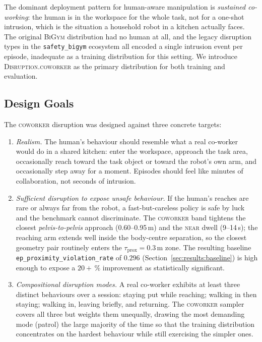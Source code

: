 \documentclass[11pt,a4paper]{report}
\newcommand{\bigym}{\textsc{BiGym}}
\newcommand{\sbigym}{\texttt{safety\_bigym}}
\newcommand{\coworker}{\textsc{coworker}}
\begin{document}
The dominant deployment pattern for human-aware manipulation is
\emph{sustained co-working}: the human is in the workspace for the
whole task, not for a one-shot intrusion, which is the situation a
household robot in a kitchen actually faces. The original \bigym{}
distribution had no human at all, and the legacy disruption types in
the \sbigym{} ecosystem all encoded a single intrusion event per
episode, inadequate as a training distribution for this setting. We
introduce \textsc{Disruption.coworker} as the primary distribution
for both training and evaluation.

\subsection{Design Goals}
\label{sec:bench:coworker:design}

The \coworker{} disruption was designed against three concrete
targets:

\begin{enumerate}[topsep=2pt,itemsep=2pt]
\item \emph{Realism.} The human's behaviour should resemble what a
  real co-worker would do in a shared kitchen: enter the workspace,
  approach the task area, occasionally reach toward the task object
  or toward the robot's own arm, and occasionally step
  away for a moment. Episodes should feel like minutes of
  collaboration, not seconds of intrusion.
\item \emph{Sufficient disruption to expose unsafe behaviour.} If
  the human's reaches are rare or always far from the robot, a
  fast-but-careless policy is safe by luck and the benchmark cannot
  discriminate. The \coworker{} band tightens the closest
  \emph{pelvis-to-pelvis} approach (0.60--0.95\,m) and the
  \textsc{near} dwell (9--14\,s); the reaching arm extends well
  inside the body-centre separation, so the closest geometry pair
  routinely enters the $\tau_{\mathrm{prox}} = 0.3$\,m zone. The
  resulting baseline
  \texttt{ep\_proximity\_violation\_rate} of $0.296$
  (Section~\ref{sec:results:baseline}) is high enough to expose a
  $20+\,\%$ improvement as statistically significant.
\item \emph{Compositional disruption modes.} A real co-worker
  exhibits at least three distinct behaviours over a session:
  staying put while reaching; walking in then staying; walking in,
  leaving briefly, and returning. The \coworker{} sampler covers all
  three but weights them unequally, drawing the most demanding mode
  (patrol) the large majority of the time so that the training
  distribution concentrates on the hardest behaviour while still
  exercising the simpler ones.
\end{enumerate}
\end{document}
